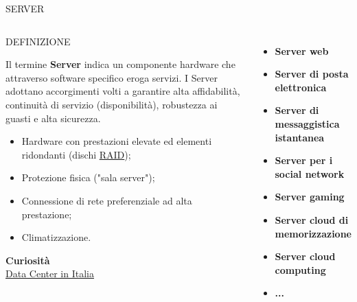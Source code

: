 \documentclass[aspectratio=1610]{beamer}
\begin{document}
\begin{frame}{SERVER}
    \begin{columns}
            \begin{alertblock}{DEFINIZIONE}
                \begin{minipage}{0.96\linewidth}
                    \justifying
                    Il termine \textbf{Server} indica un componente hardware che attraverso software specifico 
                    eroga servizi. I Server adottano accorgimenti volti a garantire alta affidabilità, 
                    continuità di servizio (disponibilità), robustezza ai guasti e alta sicurezza.
                    \begin{itemize}
                        \item Hardware con prestazioni elevate ed elementi ridondanti (dischi \href{https://it.wikipedia.org/wiki/RAID}{RAID});
                        \item Protezione fisica ("sala server");
                        \item Connessione di rete preferenziale ad alta prestazione;
                        \item Climatizzazione.
                    \end{itemize}
                    \tiny{\textbf{Curiosità}}\\
                    \tiny{\href{https://www.datacentermap.com/italy/}{Data Center in Italia}}
                \end{minipage}
            \end{alertblock}
            \begin{itemize}
                \item \textbf{Server web}
                \item \textbf{Server di posta elettronica}
                \item \textbf{Server di messaggistica istantanea}
                \item \textbf{Server per i social network}
                \item \textbf{Server gaming}
                \item \textbf{Server cloud di memorizzazione}
                \item \textbf{Server cloud computing}
                \item \textbf{...}
            \end{itemize}
    \end{columns}
\end{frame}
\end{document}
